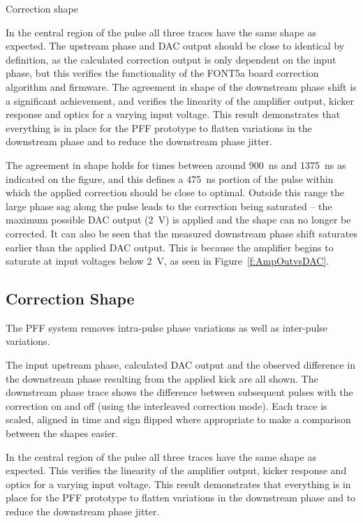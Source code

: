 \documentclass[%
 reprint,
 superscriptaddress,
 amsmath,
 amssymb,
 prstab,
]{revtex4-1}
\begin{document}
Correction shape

In the central region of the pulse all three traces have the same shape as 
expected. The upstream phase and DAC output should be close to identical by 
definition, as the calculated correction output is only dependent on the input 
phase, but this verifies the functionality of the FONT5a board correction 
algorithm and firmware. The agreement in shape of the downstream phase shift is 
a significant achievement, and verifies the linearity of the amplifier output, 
kicker response and optics for a varying input voltage. This result 
demonstrates that everything is in place for the PFF prototype to flatten 
variations in the downstream phase and to reduce the downstream phase jitter.

The agreement in shape holds for times between around 900~ns and 1375~ns as 
indicated on the figure, and this defines a 475~ns portion of the pulse within 
which the applied correction should be close to optimal. Outside this range the 
large phase sag along the pulse leads 
to the correction being saturated -- the maximum possible DAC output 
(2~V) is applied and the shape can no longer be corrected. It can also
be seen that the measured downstream phase shift saturates earlier than
the applied DAC output. This is because the amplifier begins to 
saturate at input voltages below 2~V, as seen in Figure~\ref{f:AmpOutvsDAC}.

\subsection{\label{ss:corrShape}Correction Shape}

The PFF system removes intra-pulse phase variations as well as inter-pulse 
variations. 

The input upstream phase, calculated DAC output and the observed difference in 
the downstream phase resulting from the applied kick are all shown. The 
downstream phase trace shows the difference between subsequent pulses with the 
correction on and off (using the interleaved correction mode). 
Each trace is scaled, aligned in time and sign flipped where appropriate to 
make a comparison between the shapes easier.

In the central region of the pulse all three traces have the same shape as 
expected. This verifies the linearity of the amplifier output, kicker response 
and optics for a varying input voltage. This result demonstrates that 
everything is in place for the PFF prototype to flatten variations in the 
downstream phase and to reduce the downstream phase jitter.
\end{document}
